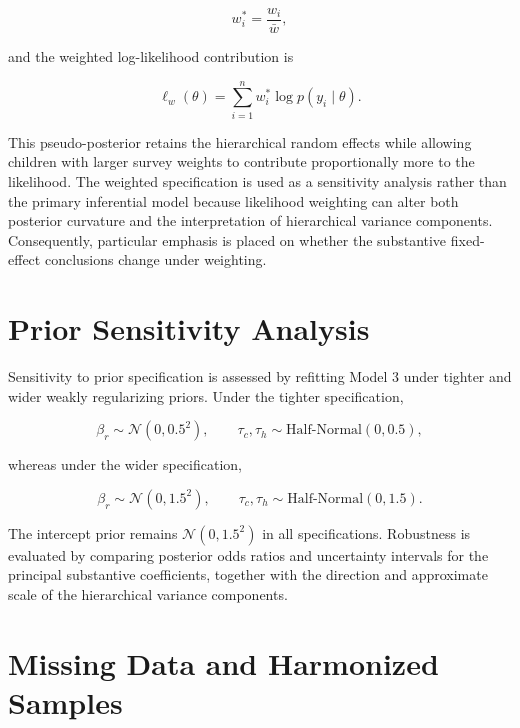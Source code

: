 \begin{equation}
w_i^* = \frac{w_i}{\bar w},
\end{equation}

and the weighted log-likelihood contribution is

\begin{equation}
\ell_w(\theta)
=
\sum_{i=1}^{n}
w_i^*
\log p(y_i\mid\theta).
\end{equation}

This pseudo-posterior retains the hierarchical random effects while allowing children with larger survey weights to contribute proportionally more to the likelihood. The weighted specification is used as a sensitivity analysis rather than the primary inferential model because likelihood weighting can alter both posterior curvature and the interpretation of hierarchical variance components. Consequently, particular emphasis is placed on whether the substantive fixed-effect conclusions change under weighting.

\section{Prior Sensitivity Analysis}

Sensitivity to prior specification is assessed by refitting Model 3 under tighter and wider weakly regularizing priors. Under the tighter specification,

\begin{equation}
\beta_r \sim \mathcal{N}(0,0.5^2),
\qquad
\tau_c,\tau_h \sim \text{Half-Normal}(0,0.5),
\end{equation}

whereas under the wider specification,

\begin{equation}
\beta_r \sim \mathcal{N}(0,1.5^2),
\qquad
\tau_c,\tau_h \sim \text{Half-Normal}(0,1.5).
\end{equation}

The intercept prior remains $\mathcal{N}(0,1.5^2)$ in all specifications. Robustness is evaluated by comparing posterior odds ratios and uncertainty intervals for the principal substantive coefficients, together with the direction and approximate scale of the hierarchical variance components.

\section{Missing Data and Harmonized Samples}

